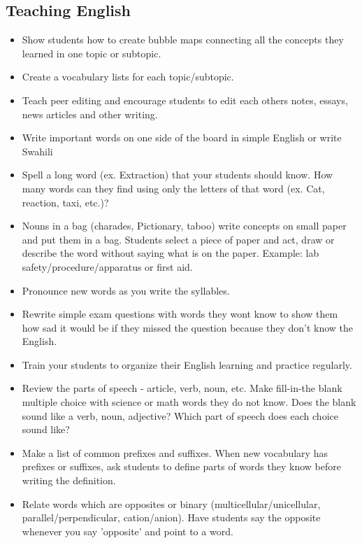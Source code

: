\subsection{Teaching English}
\begin{itemize}
\item Show students how to create bubble maps connecting all the concepts
they learned in one topic or subtopic. 
\item Create a vocabulary lists for each topic/subtopic.  
\item Teach peer editing and encourage students to edit each others notes,
essays, news articles and other writing. 
\item Write important words on one side of the board in simple English or
write Swahili  
\item Spell a long word (ex. Extraction) that your students should know.
How many words can they find using only the letters of that word (ex.
Cat, reaction, taxi, etc.)? 
\item Nouns in a bag (charades, Pictionary, taboo) write concepts on small
paper and put them in a bag. Students select a piece of paper and
act, draw or describe the word without saying what is on the paper.
Example: lab safety/procedure/apparatus or first aid. 
\item Pronounce new words as you write the syllables. 
\item Rewrite simple exam questions with words they wont know to show them
how sad it would be if they missed the question because they don't
know the English. 
\item Train your students to organize their English learning and practice
regularly.  
\item Review the parts of speech - article, verb, noun, etc. Make fill-in-the
blank multiple choice with science or math words they do not know.
Does the blank sound like a verb, noun, adjective? Which part of speech
does each choice sound like?  
\item Make a list of common prefixes and suffixes. When new vocabulary has
prefixes or suffixes, ask students to define parts of words they know
before writing the definition.  
\item Relate words which are opposites or binary (multicellular/unicellular,
parallel/perpendicular, cation/anion). Have students say the opposite
whenever you say 'opposite' and point to a word. 
\end{itemize}

